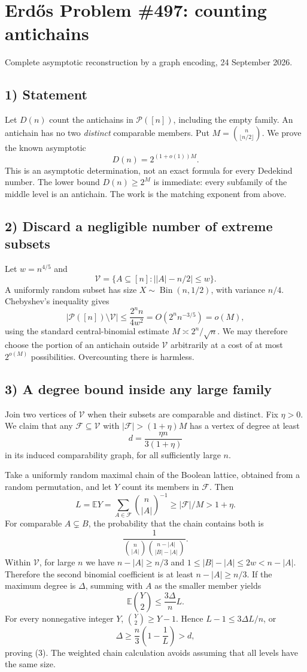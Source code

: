 \section{Erd\H{o}s Problem \#497: counting antichains}
\noindent Complete asymptotic reconstruction by a graph encoding, 24 September 2026.

\subsection*{1) Statement}
Let $D(n)$ count the antichains in $\mathcal P([n])$, including the empty family. An antichain has no two \emph{distinct} comparable members. Put $M=\binom n{\lfloor n/2\rfloor}$. We prove the known asymptotic
\[D(n)=2^{(1+o(1))M}.\tag{1}\]
This is an asymptotic determination, not an exact formula for every Dedekind number. The lower bound $D(n)\ge2^M$ is immediate: every subfamily of the middle level is an antichain. The work is the matching exponent from above.

\subsection*{2) Discard a negligible number of extreme subsets}
Let $w=n^{4/5}$ and
\[\mathcal V=\{A\subseteq[n]:\big||A|-n/2\big|\le w\}.
\]
A uniformly random subset has size $X\sim\operatorname{Bin}(n,1/2)$, with variance $n/4$. Chebyshev's inequality gives
\[|\mathcal P([n])\setminus\mathcal V|
\le\frac{2^n n}{4w^2}=O(2^n n^{-3/5})=o(M),\tag{2}\]
using the standard central-binomial estimate $M\asymp2^n/\sqrt n$. We may therefore choose the portion of an antichain outside $\mathcal V$ arbitrarily at a cost of at most $2^{o(M)}$ possibilities. Overcounting there is harmless.

\subsection*{3) A degree bound inside any large family}
Join two vertices of $\mathcal V$ when their subsets are comparable and distinct. Fix $\eta>0$. We claim that any $\mathcal F\subseteq\mathcal V$ with $|\mathcal F|>(1+\eta)M$ has a vertex of degree at least
\[d=\frac{\eta n}{3(1+\eta)}\tag{3}\]
in its induced comparability graph, for all sufficiently large $n$.

Take a uniformly random maximal chain of the Boolean lattice, obtained from a random permutation, and let $Y$ count its members in $\mathcal F$. Then
\[L=\mathbb EY=\sum_{A\in\mathcal F}\binom n{|A|}^{-1}
\ge |\mathcal F|/M>1+\eta.
\]
For comparable $A\subsetneq B$, the probability that the chain contains both is
\[\frac1{\binom n{|A|}\binom{n-|A|}{|B|-|A|}}.
\]
Within $\mathcal V$, for large $n$ we have $n-|A|\ge n/3$ and
$1\le |B|-|A|\le2w<n-|A|$. Therefore the second binomial coefficient is at least $n-|A|\ge n/3$. If the maximum degree is $\Delta$, summing with $A$ as the smaller member yields
\[\mathbb E\binom Y2\le\frac{3\Delta}{n}L.
\]
For every nonnegative integer $Y$, $\binom Y2\ge Y-1$. Hence $L-1\le3\Delta L/n$, or
\[\Delta\ge\frac n3\left(1-\frac1L\right)>d,
\]
proving (3). The weighted chain calculation avoids assuming that all levels have the same size.

